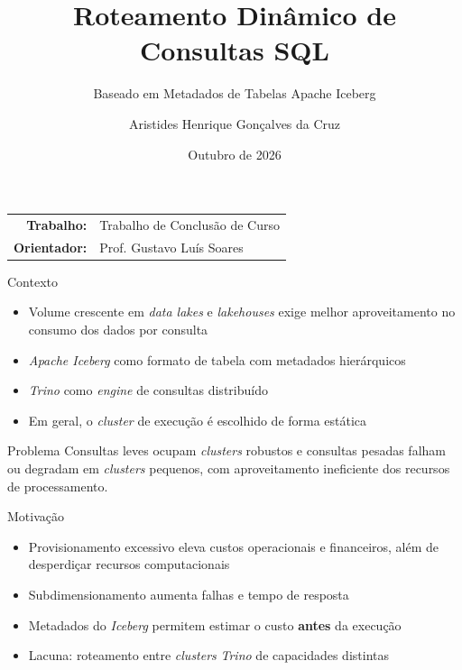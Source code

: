 \documentclass{libs/udl_format}
\title[Roteamento Dinâmico de Consultas SQL]{Roteamento Dinâmico de Consultas SQL}
\subtitle{Baseado em Metadados de Tabelas Apache Iceberg}
\author[Aristides H. G. da Cruz]{Aristides Henrique Gonçalves da Cruz}
\institute[PUC Minas]{
  Sistemas de Informação \\[0.25em]
  ICEI, PUC Minas, Unidade São Gabriel \\[0.35em]
  \email{arihenriquedev@hotmail.com}
}
\date{Outubro de 2026}
\begin{document}


\begin{frame}{}
  \maketitle
  \vspace{0.2cm}
  \centering
  \begin{tabular}{rl}
    \textbf{Trabalho:} & Trabalho de Conclusão de Curso \\
    \textbf{Orientador:} & Prof. Gustavo Luís Soares \\
  \end{tabular}
\end{frame}

\begin{frame}{Contexto}
  \begin{itemize}
    \item Volume crescente em \textit{data lakes} e \textit{lakehouses} exige melhor aproveitamento no consumo dos dados por consulta
    \item \textit{Apache Iceberg} como formato de tabela com metadados hierárquicos
    \item \textit{Trino} como \textit{engine} de consultas distribuído
    \item Em geral, o \textit{cluster} de execução é escolhido de forma estática
  \end{itemize}
  \begin{alertblock}{Problema}
    Consultas leves ocupam \textit{clusters} robustos e consultas pesadas falham ou degradam em \textit{clusters} pequenos, com aproveitamento ineficiente dos recursos de processamento.
  \end{alertblock}
\end{frame}

\begin{frame}{Motivação}
  \begin{itemize}
    \item Provisionamento excessivo eleva custos operacionais e financeiros, além de desperdiçar recursos computacionais
    \item Subdimensionamento aumenta falhas e tempo de resposta
    \item Metadados do \textit{Iceberg} permitem estimar o custo \textbf{antes} da execução
    \item Lacuna: roteamento entre \textit{clusters} \textit{Trino} de capacidades distintas
  \end{itemize}
\end{frame}
\end{document}
